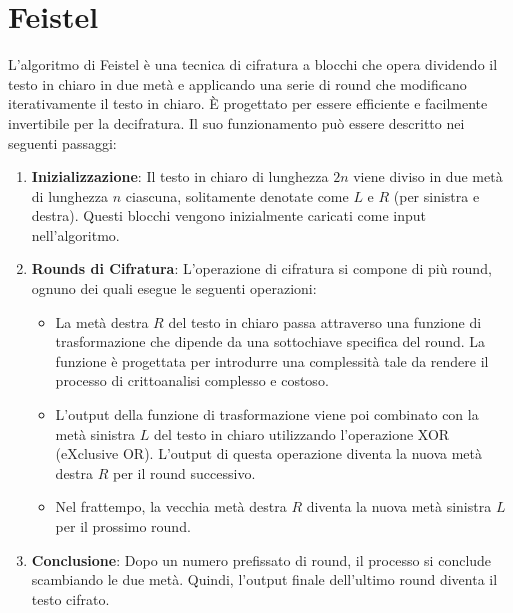 \section{Feistel}
L'algoritmo di Feistel è una tecnica di cifratura a blocchi che
opera dividendo il testo in chiaro in due metà e applicando una serie
di round che modificano iterativamente il testo in chiaro. È progettato
per essere efficiente e facilmente invertibile per la decifratura. Il suo
funzionamento può essere descritto nei seguenti passaggi:

\begin{enumerate}
  \item \textbf{Inizializzazione}: Il testo in chiaro di lunghezza \(2n\)
  viene diviso in due metà di lunghezza \(n\) ciascuna, solitamente denotate
  come \(L\) e \(R\) (per sinistra e destra). Questi blocchi vengono
  inizialmente caricati come input nell'algoritmo.
  \item \textbf{Rounds di Cifratura}: L'operazione di cifratura si compone
  di più round, ognuno dei quali esegue le seguenti operazioni:
    \begin{itemize}
      \item La metà destra \(R\) del testo in chiaro passa attraverso una
      funzione di trasformazione che dipende da una sottochiave specifica
      del round. La funzione è progettata per introdurre una complessità
      tale da rendere il processo di crittoanalisi complesso e costoso.
      \item L'output della funzione di trasformazione viene poi combinato
      con la metà sinistra \(L\) del testo in chiaro utilizzando
      l'operazione XOR (eXclusive OR). L'output di questa operazione
      diventa la nuova metà destra \(R\) per il round successivo.
      \item Nel frattempo, la vecchia metà destra \(R\) diventa la nuova
      metà sinistra \(L\) per il prossimo round.
    \end{itemize}
  \item \textbf{Conclusione}: Dopo un numero prefissato di round, il processo
  si conclude scambiando le due metà. Quindi, l'output finale dell'ultimo
  round diventa il testo cifrato.
\end{enumerate}

